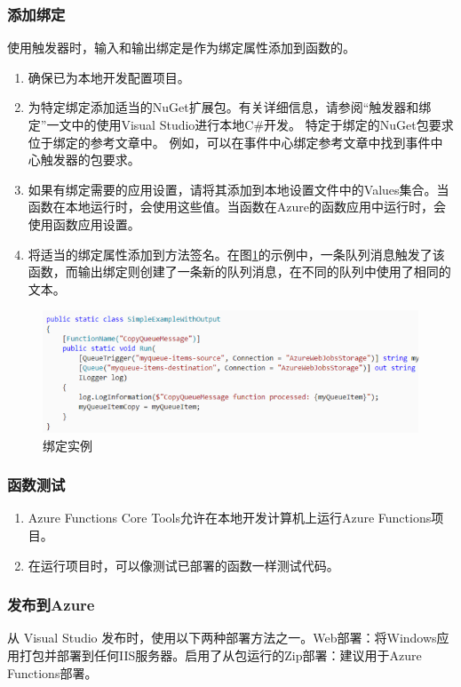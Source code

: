 \documentclass[11pt]{article}
\begin{document}
\subsubsection{添加绑定} 
使用触发器时，输入和输出绑定是作为绑定属性添加到函数的。
\begin{enumerate}
	\item 确保已为本地开发配置项目。
	\item 为特定绑定添加适当的NuGet扩展包。有关详细信息，请参阅“触发器和绑定”一文中的使用Visual Studio进行本地C\#开发。 特定于绑定的NuGet包要求位于绑定的参考文章中。 例如，可以在事件中心绑定参考文章中找到事件中心触发器的包要求。
	\item 如果有绑定需要的应用设置，请将其添加到本地设置文件中的Values集合。当函数在本地运行时，会使用这些值。当函数在Azure的函数应用中运行时，会使用函数应用设置。
	\item 将适当的绑定属性添加到方法签名。在图\ref{fig7}的示例中，一条队列消息触发了该函数，而输出绑定则创建了一条新的队列消息，在不同的队列中使用了相同的文本。
\end{enumerate}	
\begin{figure}[h]	
	\centering
	\includegraphics[scale=0.6]{figs/7.png}        %
	\caption{绑定实例}
	\label{fig7}	
\end{figure}

\subsubsection{函数测试} 
\begin{enumerate}
	\item Azure Functions Core Tools允许在本地开发计算机上运行Azure Functions项目。
	\item 在运行项目时，可以像测试已部署的函数一样测试代码。
\end{enumerate}	

\subsubsection{发布到Azure} 
从 Visual Studio 发布时，使用以下两种部署方法之一。Web部署：将Windows应用打包并部署到任何IIS服务器。启用了从包运行的Zip部署：建议用于Azure Functions部署。
\end{document}
